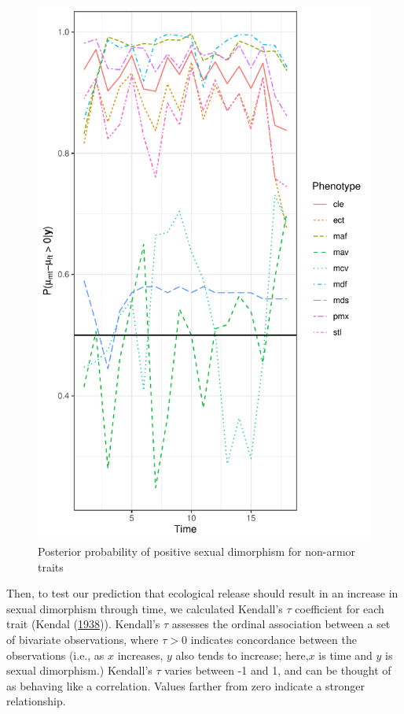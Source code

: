 \documentclass[
  12pt,
]{article}
\begin{document}
\begin{figure}

{\centering \includegraphics{../Figures/SD_Figures/post_probs_nonarmor} 

}

\caption{Posterior probability of positive sexual dimorphism for non-armor traits}\label{fig:unnamed-chunk-3}
\end{figure}

\label{fig:post_probs_nonarmor}

Then, to test our prediction that ecological release should result in an
increase in sexual dimorphism through time, we calculated Kendall's
\(\tau\) coefficient for each trait (Kendal
(\protect\hyperlink{ref-KendallsTau}{1938})). Kendall's \(\tau\)
assesses the ordinal association between a set of bivariate
observations, where \(\tau > 0\) indicates concordance between the
observations (i.e., as \(x\) increases, \(y\) also tends to increase;
here,\(x\) is time and \(y\) is sexual dimorphism.) Kendall's \(\tau\)
varies between -1 and 1, and can be thought of as behaving like a
correlation. Values farther from zero indicate a stronger relationship.
\end{document}
